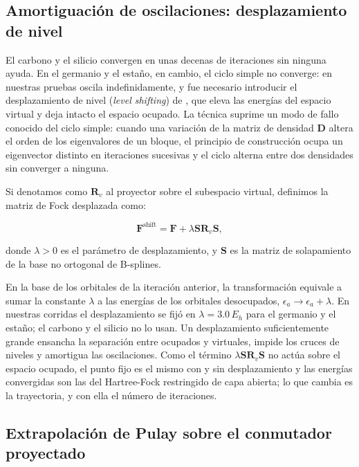 \subsection{Amortiguación de oscilaciones: desplazamiento de nivel}
\label{sec:level_shifting}

El carbono y el silicio convergen en unas decenas de iteraciones sin ninguna ayuda. En el germanio y el estaño, en cambio, el ciclo simple no converge: en nuestras pruebas oscila indefinidamente, y fue necesario introducir el desplazamiento de nivel (\textit{level shifting}) de \textcite{Saunders1973}, que eleva las energías del espacio virtual y deja intacto el espacio ocupado. La técnica suprime un modo de fallo conocido del ciclo simple: cuando una variación de la matriz de densidad $\bm{D}$ altera el orden de los eigenvalores de un bloque, el principio de construcción ocupa un eigenvector distinto en iteraciones sucesivas y el ciclo alterna entre dos densidades sin converger a ninguna.

Si denotamos como $\bm{R}_v$ al proyector sobre el subespacio virtual, definimos la matriz de Fock desplazada como:

\begin{equation}
    \bm{F}^{\text{shift}} = \bm{F} + \lambda \bm{S} \bm{R}_v \bm{S},
\end{equation}

donde $\lambda > 0$ es el parámetro de desplazamiento, y $\bm{S}$ es la matriz de solapamiento de la base no ortogonal de B-splines.

En la base de los orbitales de la iteración anterior, la transformación equivale a sumar la constante $\lambda$ a las energías de los orbitales desocupados, $\epsilon_a \rightarrow \epsilon_a + \lambda$. En nuestras corridas el desplazamiento se fijó en $\lambda = 3.0\,E_h$ para el germanio y el estaño; el carbono y el silicio no lo usan. Un desplazamiento suficientemente grande ensancha la separación entre ocupados y virtuales, impide los cruces de niveles y amortigua las oscilaciones. Como el término $\lambda\bm{S}\bm{R}_v\bm{S}$ no actúa sobre el espacio ocupado, el punto fijo es el mismo con y sin desplazamiento y las energías convergidas son las del Hartree-Fock restringido de capa abierta; lo que cambia es la trayectoria, y con ella el número de iteraciones.

\subsection{Extrapolación de Pulay sobre el conmutador proyectado}
\label{sec:cdiis_metodo}

